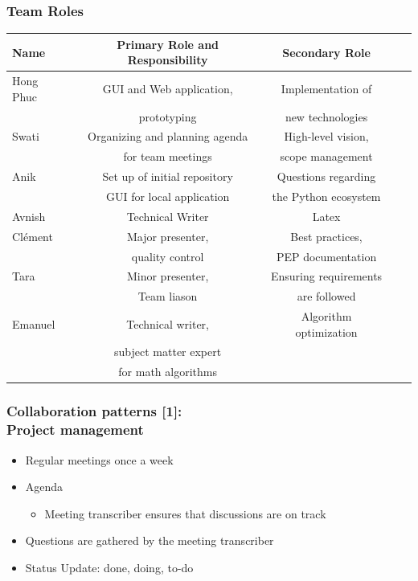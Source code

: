 \documentclass{beamer}
\begin{document}
  \begin{frame}
\frametitle{Team Roles}
\small
\begin{table}
\begin{tabular}{l | c | c | c | c }
Name & Primary Role and Responsibility & Secondary Role \\
\hline
Hong Phuc & GUI and Web application,& Implementation of\\
& prototyping & new technologies\\
\hline
Swati & Organizing and planning agenda& High-level vision, \\
& for team meetings & scope management\\
\hline
Anik & Set up of initial repository& Questions regarding\\
& GUI for local application & the Python ecosystem\\
\hline
Avnish & Technical Writer & Latex \\
\hline
Clément & Major presenter, & Best practices, \\
& quality control  & PEP documentation\\
\hline
Tara & Minor presenter, & Ensuring requirements \\
& Team liason  & are followed\\
\hline
Emanuel & Technical writer, &  Algorithm optimization\\
& subject matter expert  & \\
& for math algorithms  & \\
\end{tabular}
\end{table}
\end{frame}



\begin{frame}
\frametitle{Collaboration patterns [1]:\\ Project management}
\begin{itemize}
 \item Regular meetings once a week
 \item Agenda
   \begin{itemize}
   \item Meeting transcriber ensures that discussions are on track
   \end{itemize}
   \item Questions are gathered by the meeting transcriber
   \item Status Update: done, doing, to-do
\end{itemize}
\end{frame}
\end{document}
